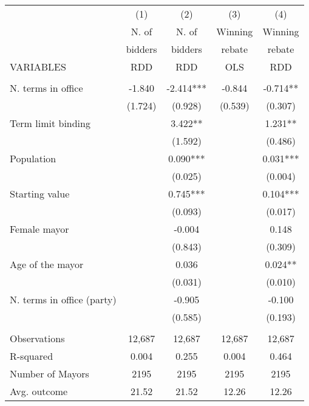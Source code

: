 \documentclass[]{article}
\begin{document}
\begin{tabular}{lcccc} \hline
 & (1) & (2) & (3) & (4) \\
 & N. of & N. of & Winning & Winning \\
 & bidders & bidders & rebate & rebate \\
VARIABLES & RDD & RDD & OLS & RDD \\ \hline
 &  &  &  &  \\
N. terms in office & -1.840 & -2.414*** & -0.844 & -0.714** \\
 & (1.724) & (0.928) & (0.539) & (0.307) \\
Term limit binding &  & 3.422** &  & 1.231** \\
 &  & (1.592) &  & (0.486) \\
Population &  & 0.090*** &  & 0.031*** \\
 &  & (0.025) &  & (0.004) \\
Starting value &  & 0.745*** &  & 0.104*** \\
 &  & (0.093) &  & (0.017) \\
Female mayor &  & -0.004 &  & 0.148 \\
 &  & (0.843) &  & (0.309) \\
Age of the mayor &  & 0.036 &  & 0.024** \\
 &  & (0.031) &  & (0.010) \\
N. terms in office (party) &  & -0.905 &  & -0.100 \\
 &  & (0.585) &  & (0.193) \\
 &  &  &  &  \\
Observations & 12,687 & 12,687 & 12,687 & 12,687 \\
R-squared & 0.004 & 0.255 & 0.004 & 0.464 \\
Number of Mayors & 2195 & 2195 & 2195 & 2195 \\
 Avg. outcome & 21.52 & 21.52 & 12.26 & 12.26 \\ \hline
\end{tabular}
\end{document}
